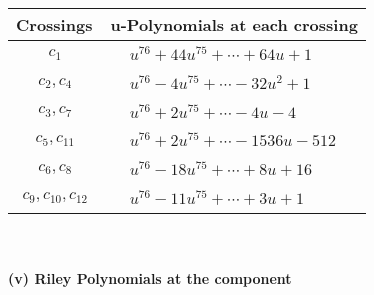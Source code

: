 \documentclass[1p]{elsarticle_modified}
\theoremstyle{definition}
\begin{document}
\begin{tabular}{m{50pt}|m{274pt}}
Crossings & \hspace{64pt}u-Polynomials at each crossing \\
\hline $$\begin{aligned}c_{1}\end{aligned}$$&$\begin{aligned}
&u^{76}+44 u^{75}+\cdots+64 u+1
\end{aligned}$\\
\hline $$\begin{aligned}c_{2},c_{4}\end{aligned}$$&$\begin{aligned}
&u^{76}-4 u^{75}+\cdots-32 u^2+1
\end{aligned}$\\
\hline $$\begin{aligned}c_{3},c_{7}\end{aligned}$$&$\begin{aligned}
&u^{76}+2 u^{75}+\cdots-4 u-4
\end{aligned}$\\
\hline $$\begin{aligned}c_{5},c_{11}\end{aligned}$$&$\begin{aligned}
&u^{76}+2 u^{75}+\cdots-1536 u-512
\end{aligned}$\\
\hline $$\begin{aligned}c_{6},c_{8}\end{aligned}$$&$\begin{aligned}
&u^{76}-18 u^{75}+\cdots+8 u+16
\end{aligned}$\\
\hline $$\begin{aligned}c_{9},c_{10},c_{12}\end{aligned}$$&$\begin{aligned}
&u^{76}-11 u^{75}+\cdots+3 u+1
\end{aligned}$\\
\hline
\end{tabular}\\~\\
\newpage\renewcommand{\arraystretch}{1}
\flushleft \textbf{(v) Riley Polynomials at the component}\newline \\
\end{document}

